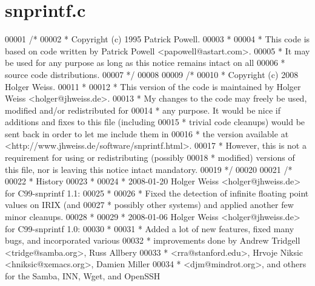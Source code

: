 \hypertarget{snprintf_8c_source}{}\section{snprintf.\+c}
\label{snprintf_8c_source}

\begin{DoxyCode}
00001 \textcolor{comment}{/*}
00002 \textcolor{comment}{ * Copyright (c) 1995 Patrick Powell.}
00003 \textcolor{comment}{ *}
00004 \textcolor{comment}{ * This code is based on code written by Patrick Powell <papowell@astart.com>.}
00005 \textcolor{comment}{ * It may be used for any purpose as long as this notice remains intact on all}
00006 \textcolor{comment}{ * source code distributions.}
00007 \textcolor{comment}{ */}
00008 
00009 \textcolor{comment}{/*}
00010 \textcolor{comment}{ * Copyright (c) 2008 Holger Weiss.}
00011 \textcolor{comment}{ *}
00012 \textcolor{comment}{ * This version of the code is maintained by Holger Weiss <holger@jhweiss.de>.}
00013 \textcolor{comment}{ * My changes to the code may freely be used, modified and/or redistributed for}
00014 \textcolor{comment}{ * any purpose.  It would be nice if additions and fixes to this file (including}
00015 \textcolor{comment}{ * trivial code cleanups) would be sent back in order to let me include them in}
00016 \textcolor{comment}{ * the version available at <http://www.jhweiss.de/software/snprintf.html>.}
00017 \textcolor{comment}{ * However, this is not a requirement for using or redistributing (possibly}
00018 \textcolor{comment}{ * modified) versions of this file, nor is leaving this notice intact mandatory.}
00019 \textcolor{comment}{ */}
00020 
00021 \textcolor{comment}{/*}
00022 \textcolor{comment}{ * History}
00023 \textcolor{comment}{ *}
00024 \textcolor{comment}{ * 2008-01-20 Holger Weiss <holger@jhweiss.de> for C99-snprintf 1.1:}
00025 \textcolor{comment}{ *}
00026 \textcolor{comment}{ *  Fixed the detection of infinite floating point values on IRIX (and}
00027 \textcolor{comment}{ *  possibly other systems) and applied another few minor cleanups.}
00028 \textcolor{comment}{ *}
00029 \textcolor{comment}{ * 2008-01-06 Holger Weiss <holger@jhweiss.de> for C99-snprintf 1.0:}
00030 \textcolor{comment}{ *}
00031 \textcolor{comment}{ *  Added a lot of new features, fixed many bugs, and incorporated various}
00032 \textcolor{comment}{ *  improvements done by Andrew Tridgell <tridge@samba.org>, Russ Allbery}
00033 \textcolor{comment}{ *  <rra@stanford.edu>, Hrvoje Niksic <hniksic@xemacs.org>, Damien Miller}
00034 \textcolor{comment}{ *  <djm@mindrot.org>, and others for the Samba, INN, Wget, and OpenSSH}

\end{DoxyCode}
